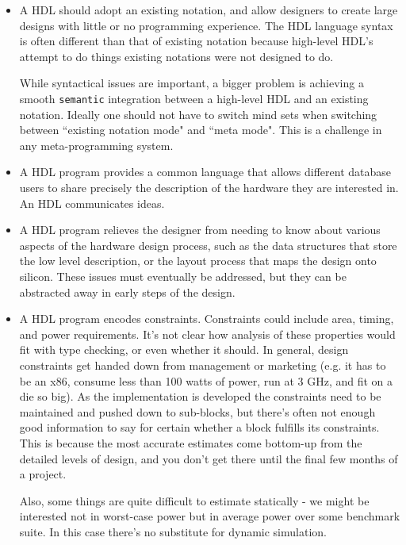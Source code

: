 \documentclass[10pt,twoside]{article}
\begin{document}
\begin{itemize}

\item A HDL should adopt an existing notation,
and allow designers to create large designs with little or
no programming experience. The HDL language syntax is often
different than that of existing notation because high-level HDL's
attempt to do things existing notations were not designed to do.

While syntactical issues are important, a bigger problem is achieving a
smooth {\tt semantic} integration between a high-level HDL and an
existing notation. Ideally one should not have to switch mind sets when
switching between ``existing notation mode" and ``meta mode". This is a
challenge in any meta-programming system. 


\item A HDL program provides a common language that allows different
database users to share precisely the description of the hardware they are
interested in. An HDL communicates ideas. 

\item A HDL program relieves the designer from needing to know about
various aspects of the hardware design process, such as the data
structures that store the low level description, or the layout process
that maps the design onto silicon. These issues must eventually be
addressed, but they can be abstracted away in early steps of the
design. 

\item A HDL program encodes constraints. Constraints could include area,
timing, and power requirements. It's not clear how analysis of these
properties would fit with type checking, or even whether it should. In
general, design constraints get handed down from management or marketing
(e.g. it has to be an x86, consume less than 100 watts of power, run at 3 GHz,
and fit on a die so big). As the implementation is developed the
constraints need to be maintained and pushed down to sub-blocks, but
there's often not enough good information to say for certain whether a
block fulfills its constraints. This is because the most accurate
estimates come bottom-up from the detailed levels of design, and you
don't get there until the final few months of a project.

Also, some things are quite difficult to estimate statically - we might
be interested not in worst-case power but in average power over some
benchmark suite. In this case there's no substitute for dynamic
simulation. 


\end{itemize}
\end{document}
